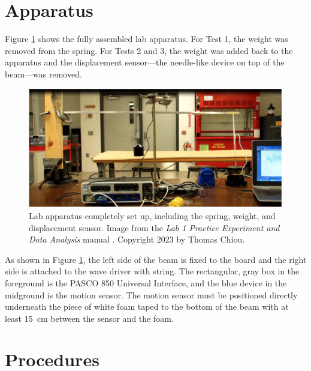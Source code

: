 \documentclass[12 pt]{report}
\begin{document}
\section{Apparatus} \label{apparatus}
Figure \ref{fig:lab_apparatus} shows the fully assembled lab apparatus. For Test \num{1}, the weight was removed from the spring. For Tests \num{2} and \num{3}, the weight was added back to the apparatus and the displacement sensor---the needle-like device on top of the beam---was removed.

\begin{figure}[htbp]
\centering
\includegraphics[width=6in]{images/Lab_Apparatus}
\caption{Lab apparatus completely set up, including the spring, weight, and displacement sensor. Image from the \textit{Lab 1 Practice Experiment and Data Analysis} manual \cite{lab_procedures}. Copyright 2023 by Thomas Chiou.}
\label{fig:lab_apparatus}
\end{figure}

As shown in Figure \ref{fig:lab_apparatus}, the left side of the beam is fixed to the board and the right side is attached to the wave driver with string. The rectangular, gray box in the foreground is the PASCO 850 Universal Interface, and the blue device in the midground is the motion sensor. The motion sensor must be positioned directly underneath the piece of white foam taped to the bottom of the beam with at least \qty{15}{\cm} between the sensor and the foam.

\section{Procedures} \label{procedures}
\end{document}
